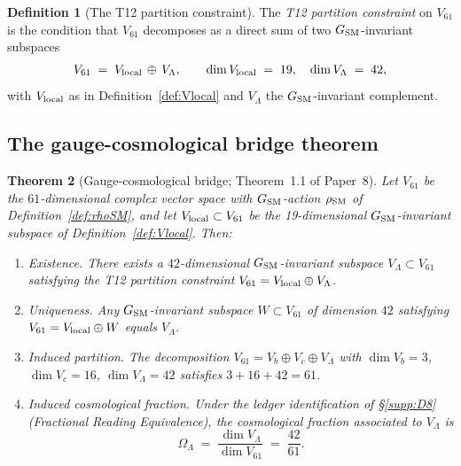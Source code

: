 \documentclass[11pt]{article}
\theoremstyle{plain}
\newtheorem{theorem}{Theorem}[section]
\theoremstyle{definition}
\newtheorem{definition}[theorem]{Definition}
\theoremstyle{remark}
\begin{document}
\begin{definition}[The T12 partition constraint]\label{def:T12}
The \emph{T12 partition constraint} on $V_{61}$ is the condition that $V_{61}$ decomposes as a direct sum of two $G_{\rm SM}$-invariant subspaces
\[
  V_{61} \;=\; V_{\rm local} \,\oplus\, V_\Lambda,
  \qquad \dim V_{\rm local} \;=\; 19, \quad \dim V_\Lambda \;=\; 42,
\]
with $V_{\rm local}$ as in Definition~\ref{def:Vlocal} and $V_\Lambda$ the $G_{\rm SM}$-invariant complement.
\end{definition}

\bigskip

\subsection{The gauge-cosmological bridge theorem}\label{supp:kernel_theorem}

\begin{theorem}[Gauge-cosmological bridge; Theorem~1.1 of Paper~8]\label{thm:formal_kernel}
Let $V_{61}$ be the $61$-dimensional complex vector space with $G_{\rm SM}$-action $\rho_{\rm SM}$ of Definition~\ref{def:rhoSM}, and let $V_{\rm local} \subset V_{61}$ be the 19-dimensional $G_{\rm SM}$-invariant subspace of Definition~\ref{def:Vlocal}.  Then:
\begin{enumerate}[leftmargin=2.5em,label=\textup{(\roman*)},itemsep=3pt]
  \item \emph{Existence.}  There exists a $42$-dimensional $G_{\rm SM}$-invariant subspace $V_\Lambda \subset V_{61}$ satisfying the T12 partition constraint $V_{61} = V_{\rm local} \oplus V_\Lambda$.
  \item \emph{Uniqueness.}  Any $G_{\rm SM}$-invariant subspace $W \subset V_{61}$ of dimension $42$ satisfying $V_{61} = V_{\rm local} \oplus W$ equals $V_\Lambda$.
  \item \emph{Induced partition.}  The decomposition $V_{61} = V_b \oplus V_c \oplus V_\Lambda$ with $\dim V_b = 3$, $\dim V_c = 16$, $\dim V_\Lambda = 42$ satisfies $3 + 16 + 42 = 61$.
  \item \emph{Induced cosmological fraction.}  Under the ledger identification of \S\ref{supp:D8} (Fractional Reading Equivalence), the cosmological fraction associated to $V_\Lambda$ is
  \[
    \Omega_\Lambda \;=\; \frac{\dim V_\Lambda}{\dim V_{61}} \;=\; \frac{42}{61}.
  \]
\end{enumerate}
\end{theorem}
\end{document}
